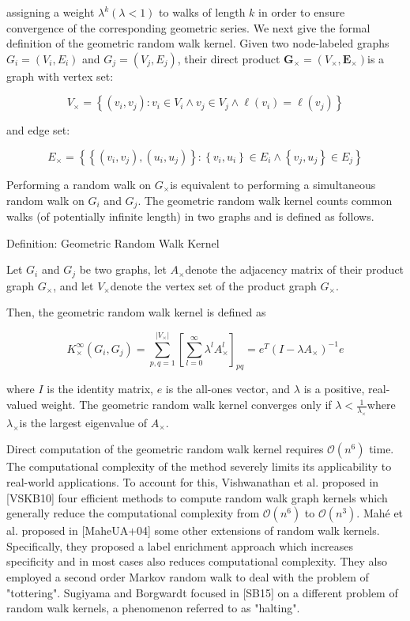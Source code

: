 assigning a weight $\lambda^{k}(\lambda<1)$ to walks of length $k$ in order to ensure convergence of the corresponding geometric series. We next give the formal definition of the geometric random walk kernel. Given two node-labeled graphs $G_{i}=\left(V_{i}, E_{i}\right)$ and $G_{j}=\left(V_{j}, E_{j}\right)$, their direct product $\boldsymbol{G}_{\times}=\left(V_{\times}, \boldsymbol{E}_{\times}\right)$is a graph with vertex set:

$$
V_{\times}=\left\{\left(v_{i}, v_{j}\right): v_{i} \in V_{i} \wedge v_{j} \in V_{j} \wedge \ell\left(v_{i}\right)=\ell\left(v_{j}\right)\right\}
$$

and edge set:

$$
E_{\times}=\left\{\left\{\left(v_{i}, v_{j}\right),\left(u_{i}, u_{j}\right)\right\}:\left\{v_{i}, u_{i}\right\} \in E_{i} \wedge\left\{v_{j}, u_{j}\right\} \in E_{j}\right\}
$$

Performing a random walk on $G_{\times}$is equivalent to performing a simultaneous random walk on $G_{i}$ and $G_{j}$. The geometric random walk kernel counts common walks (of potentially infinite length) in two graphs and is defined as follows.

{Definition: Geometric Random Walk Kernel}

Let $G_{i}$ and $G_{j}$ be two graphs, let $A_{\times}$denote the adjacency matrix of their product graph $G_{\times}$, and let $V_{\times}$denote the vertex set of the product graph $G_{\times}$.

Then, the geometric random walk kernel is defined as

$$
K_{\times}^{\infty}\left(G_{i}, G_{j}\right)=\sum_{p, q=1}^{\left|V_{\times}\right|}\left[\sum_{l=0}^{\infty} \lambda^{l} A_{\times}^{l}\right]_{p q}=e^{T}\left(I-\lambda A_{\times}\right)^{-1} e
$$

where $I$ is the identity matrix, $e$ is the all-ones vector, and $\lambda$ is a positive, real-valued weight. The geometric random walk kernel converges only if $\lambda<\frac{1}{\lambda_{\times}}$where $\lambda_{\times}$is the largest eigenvalue of $A_{\times}$.

Direct computation of the geometric random walk kernel requires $\mathcal{O}\left(n^{6}\right)$ time. The computational complexity of the method severely limits its applicability to real-world applications. To account for this, Vishwanathan et al. proposed in [VSKB10] four efficient methods to compute random walk graph kernels which generally reduce the computational complexity from $\mathcal{O}\left(n^{6}\right)$ to $\mathcal{O}\left(n^{3}\right)$. Mahé et al. proposed in [MaheUA+04] some other extensions of random walk kernels. Specifically, they proposed a label enrichment approach which increases specificity and in most cases also reduces computational complexity. They also employed a second order Markov random walk to deal with the problem of "tottering". Sugiyama and Borgwardt focused in [SB15] on a different problem of random walk kernels, a phenomenon referred to as "halting".


